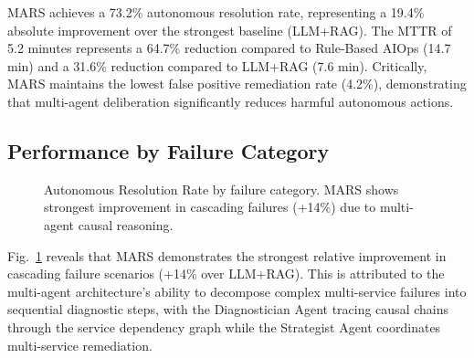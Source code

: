 \documentclass[journal]{IEEEtran}
\begin{document}
MARS achieves a 73.2\% autonomous resolution rate, representing a 19.4\% absolute improvement over the strongest baseline (LLM+RAG). The MTTR of 5.2 minutes represents a 64.7\% reduction compared to Rule-Based AIOps (14.7 min) and a 31.6\% reduction compared to LLM+RAG (7.6 min). Critically, MARS maintains the lowest false positive remediation rate (4.2\%), demonstrating that multi-agent deliberation significantly reduces harmful autonomous actions.

\subsection{Performance by Failure Category}

\begin{figure}[t]
\centering
{}
\caption{Autonomous Resolution Rate by failure category. MARS shows strongest improvement in cascading failures (+14\%) due to multi-agent causal reasoning.}
\label{fig:arr_by_category}
\end{figure}

Fig.~\ref{fig:arr_by_category} reveals that MARS demonstrates the strongest relative improvement in cascading failure scenarios (+14\% over LLM+RAG). This is attributed to the multi-agent architecture's ability to decompose complex multi-service failures into sequential diagnostic steps, with the Diagnostician Agent tracing causal chains through the service dependency graph while the Strategist Agent coordinates multi-service remediation.
\end{document}
